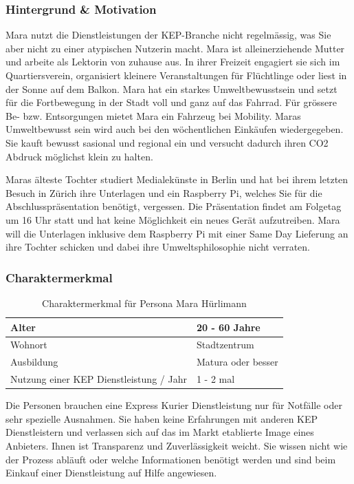 \subsubsection{Hintergrund \& Motivation}
Mara nutzt die Dienstleistungen der KEP-Branche nicht regelmässig, was Sie aber nicht zu einer atypischen Nutzerin macht. Mara ist alleinerziehende Mutter und arbeite als Lektorin von zuhause aus. In ihrer Freizeit engagiert sie sich im Quartiersverein, organisiert kleinere Veranstaltungen für Flüchtlinge oder liest in der Sonne auf dem Balkon. Mara hat ein starkes Umweltbewusstsein und setzt für die Fortbewegung in der Stadt voll und ganz auf das Fahrrad. Für grössere Be- bzw. Entsorgungen mietet Mara ein Fahrzeug bei Mobility. Maras Umweltbewusst sein wird auch bei den wöchentlichen Einkäufen wiedergegeben. Sie kauft bewusst sasional und regional ein und versucht dadurch ihren CO2 Abdruck möglichst klein zu halten.

Maras älteste Tochter studiert Medialekünste in Berlin und hat bei ihrem letzten Besuch in Zürich ihre Unterlagen und ein Raspberry Pi, welches Sie für die Abschlusspräsentation benötigt, vergessen. Die Präsentation findet am Folgetag um 16 Uhr statt und hat keine Möglichkeit ein neues Gerät aufzutreiben. Mara will die Unterlagen inklusive dem Raspberry Pi mit einer Same Day Lieferung an ihre Tochter schicken und dabei ihre Umweltsphilosophie nicht verraten.

\subsubsection{Charaktermerkmal}
\begin{table}[]
\centering

\label{my-label}
\begin{tabular}{|l|l|}
\hline
Alter                                   & 20 - 60 Jahre        \\ \hline
Wohnort                                 & Stadtzentrum         \\ \hline
Ausbildung                              & Matura oder besser \\ \hline
Nutzung einer KEP Dienstleistung / Jahr & 1 - 2 mal            \\ \hline
\end{tabular}
\caption{Charaktermerkmal für Persona Mara Hürlimann}
\end{table}

Die Personen brauchen eine Express Kurier Dienstleistung nur für Notfälle oder sehr spezielle Ausnahmen. Sie haben keine Erfahrungen mit anderen KEP Dienstleistern und verlassen sich auf das im Markt etablierte Image eines Anbieters. Ihnen ist Transparenz und Zuverlässigkeit weicht. Sie wissen nicht wie der Prozess abläuft oder welche Informationen benötigt werden und sind beim Einkauf einer Dienstleistung auf Hilfe angewiesen.




